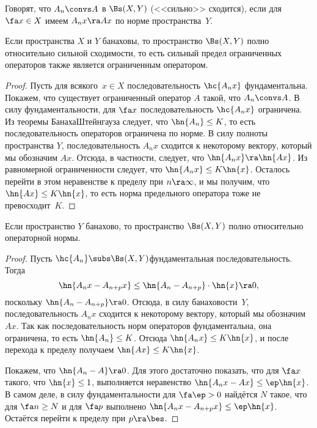 \documentclass[a4paper]{article}
\begin{document}
\begin{df}
Говорят, что $A_n \convs A$ в $\Bs(X,Y)$ (<<сильно>> сходится), если
для $\fa x \in X$ имеем $A_n x\ra Ax$ по норме пространства~$Y$.
\end{df}

\begin{stm}
Если пространства $X$ и $Y$ банаховы, то пространство $\Bs(X,Y)$ полно
относительно сильной сходимости, то есть сильный предел ограниченных
операторов также является ограниченным оператором.
\end{stm}
\begin{proof}
Пусть для всякого~${x \in X}$ последовательность $\hc{A_nx}$ фундаментальна. Покажем, что
существует ограниченный оператор $A$ такой, что $A_n \convs A$.
В силу фундаментальности, для $\fa x$ последовательность $\hc{A_n x}$ ограничена.
Из теоремы Банаха\ч Штейнгауза
следует, что $\hn{A_n} \le K$, то есть последовательность операторов ограничена по норме.
В силу полноты пространства $Y$, последовательность $A_n x$ сходится к некоторому вектору,
который мы обозначим $Ax$. Отсюда, в частности, следует, что $\hn{A_n x} \ra \hn{Ax}$.
Из равномерной ограниченности следует, что $\hn{A_n x} \le K\hn{x}$. Осталось перейти в
этом неравенстве к пределу при $n\ra\infty$, и мы получим,
что $\hn{Ax} \le K\hn{x}$, то есть норма предельного оператора тоже не превосходит~$K$.
\end{proof}

\begin{stm}
Если пространство $Y$ банахово, то пространство $\Bs(X,Y)$ полно относительно операторной нормы.
\end{stm}
\begin{proof}
Пусть $\hc{A_n} \subs \Bs(X,Y)$\т фундаментальная последовательность. Тогда
$$\hn{A_nx - A_{n+p}x} \le \hn{A_n - A_{n+p}}\cdot \hn{x} \ra 0,$$
поскольку $\hn{A_n - A_{n+p}} \ra 0$.
Отсюда, в силу банаховости~$Y$, последовательность $A_nx$ сходится к некоторому вектору,
который мы обозначим $Ax$. Так как последовательность норм операторов фундаментальна,
она ограничена, то есть $\hn{A_n} \le K$. Отсюда $\hn{A_n x} \le K\hn{x}$, и после
перехода к пределу получаем $\hn{Ax} \le K\hn{x}$.

Покажем, что $\hn{A_n - A} \ra 0$. Для этого достаточно показать, что для $\fa x$ такого, что $\hn{x} \le 1$,
выполняется неравенство $\hn{A_n x - Ax} \le \ep\hn{x}$.
В самом деле, в силу фундаментальности для $\fa \ep > 0$ найдётся $N$ такое, что для
$\fa n \ge N$ и для $\fa p$ выполнено $\hn{A_n x- A_{n+p}x} \le \ep\hn{x}$. Остаётся
перейти к пределу при $p\ra\bes$.
\end{proof}
\end{document}
